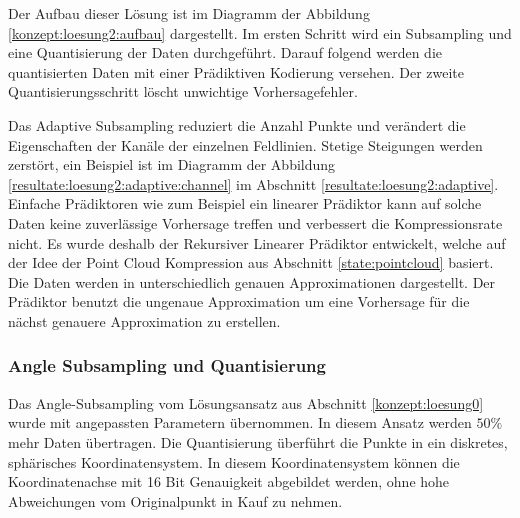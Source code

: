 Der Aufbau dieser Lösung ist im Diagramm der Abbildung \ref{konzept:loesung2:aufbau} dargestellt. Im ersten Schritt wird ein Subsampling und eine Quantisierung der Daten durchgeführt. Darauf folgend werden die quantisierten Daten mit einer Prädiktiven Kodierung versehen. Der zweite Quantisierungsschritt löscht unwichtige Vorhersagefehler. 

Das Adaptive Subsampling reduziert die Anzahl Punkte und verändert die Eigenschaften der Kanäle der einzelnen Feldlinien. Stetige Steigungen werden zerstört, ein Beispiel ist im Diagramm der Abbildung \ref{resultate:loesung2:adaptive:channel} im Abschnitt \ref{resultate:loesung2:adaptive}. Einfache Prädiktoren wie zum Beispiel ein linearer Prädiktor kann auf solche Daten keine zuverlässige Vorhersage treffen und verbessert die Kompressionsrate nicht. Es wurde deshalb der Rekursiver Linearer Prädiktor entwickelt, welche auf der Idee der Point Cloud Kompression aus Abschnitt \ref{state:pointcloud} basiert. Die Daten werden in unterschiedlich genauen Approximationen dargestellt. Der Prädiktor benutzt die ungenaue Approximation um eine Vorhersage für die nächst genauere Approximation zu erstellen.

\subsubsection{Angle Subsampling und Quantisierung}
Das Angle-Subsampling vom Lösungsansatz aus Abschnitt \ref{konzept:loesung0} wurde mit angepassten Parametern übernommen. In diesem Ansatz werden $50\%$ mehr Daten übertragen. Die Quantisierung überführt die Punkte in ein diskretes, sphärisches Koordinatensystem. In diesem Koordinatensystem können die Koordinatenachse mit 16 Bit Genauigkeit abgebildet werden, ohne hohe Abweichungen vom Originalpunkt in Kauf zu nehmen.

